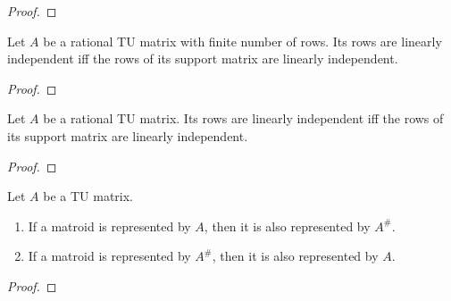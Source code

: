 \begin{proof}
    \leanok
    \SeeLean
\end{proof}

\begin{lemma}
    \label{Matrix.IsTotallyUnimodular.linearIndependent_iff_support_linearIndependent_of_finite}
    \leanok
    Let $A$ be a rational TU matrix with finite number of rows.
    Its rows are linearly independent iff the rows of its support matrix are linearly independent.
\end{lemma}

\begin{proof}
    \leanok
    \SeeLean
\end{proof}

\begin{lemma}
    \label{Matrix.IsTotallyUnimodular.linearIndependent_iff_support_linearIndependent}
    \leanok
    Let $A$ be a rational TU matrix.
    Its rows are linearly independent iff the rows of its support matrix are linearly independent.
\end{lemma}

\begin{proof}
    \leanok
    \SeeLean
\end{proof}

\begin{lemma}
    \label{Matrix.IsTotallyUnimodular.toMatroid_eq_support_toMatroid}
    \leanok
    Let $A$ be a TU matrix.
    \begin{enumerate}
        \item If a matroid is represented by $A$, then it is also represented by $A^{\#}$.
        \item If a matroid is represented by $A^{\#}$, then it is also represented by $A$.
    \end{enumerate}
\end{lemma}

\begin{proof}
    \leanok
    \SeeLean
\end{proof}


